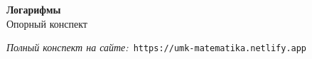 \documentclass{umk-matematika}
\begin{document}
\begin{center}
{\Large\bfseries Логарифмы}
\\[0.3cm]{\large Опорный конспект}
\end{center}
\vspace{0.5cm}

\begin{center}
\textit{Полный конспект на сайте:}\
\texttt{https://umk-matematika.netlify.app}
\end{center}
\end{document}
